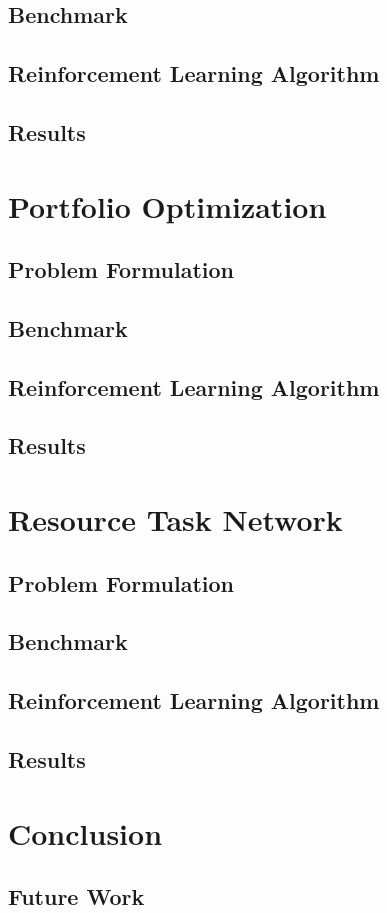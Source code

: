 \documentclass[12pt]{article}
\begin{document}
\subsection{Benchmark}

\subsection{Reinforcement Learning Algorithm}

\subsection{Results}

\section{Portfolio Optimization}

\subsection{Problem Formulation}

\subsection{Benchmark}

\subsection{Reinforcement Learning Algorithm}

\subsection{Results}

\section{Resource Task Network}

\subsection{Problem Formulation}

\subsection{Benchmark}

\subsection{Reinforcement Learning Algorithm}

\subsection{Results}

\section{Conclusion}

\subsection{Future Work}

\newpage


\end{document}
